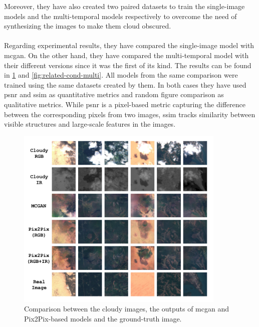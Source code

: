 \documentclass[../main.tex]{subfiles}
\begin{document}
Moreover, they have also created two paired datasets to train the single-image models and the multi-temporal models respectively to overcome the need of synthesizing the images to make them cloud obscured.
\\
\\
Regarding experimental results, they have compared the single-image model with \gls{mcgan}. On the other hand, they have compared the multi-temporal model with their different versions since it was the first of its kind. The results can be found in \ref{fig:related-cond-single} and \ref{fig:related-cond-multi}. All models from the same comparison were trained using the same datasets created by them. In both cases they have used \gls{psnr} and \gls{ssim} as quantitative metrics and random figure comparison as qualitative metrics. While \gls{psnr} is a pixel-based metric capturing the difference between the corresponding pixels from two images, \gls{ssim} tracks similarity between visible structures and large-scale features in the images.
\begin{figure}[H]
	\captionsetup{justification=centering}
	\centering
	\includegraphics[width=10cm]{imgs/relatedwork/conditional-single-image.png}
	\caption{Comparison between the cloudy images, the outputs of \gls{mcgan} and Pix2Pix-based models and the ground-truth image.}
	\label{fig:related-cond-single}
\end{figure}
\end{document}
